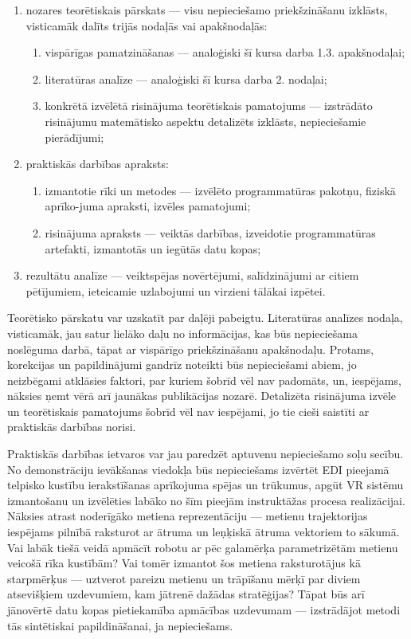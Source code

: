 \documentclass[12pt, a4paper]{article}
\numberwithin{equation}{section} %
\begin{document}
\begin{enumerate}
    \item nozares teorētiskais pārskats --- visu nepieciešamo priekšzināšanu izklāsts, visticamāk dalīts trijās nodaļās vai apakšnodaļās:
    \begin{enumerate}
        \item vispārīgas pamatzināšanas --- analoģiski šī kursa darba 1.3. apakšnodaļai;
        \item literatūras analīze --- analoģiski šī kursa darba 2. nodaļai;
        \item konkrētā izvēlētā risinājuma teorētiskais pamatojums --- izstrādāto risinājumu matemātisko aspektu detalizēts izklāsts, nepieciešamie pierādījumi;
    \end{enumerate}
    \item praktiskās darbības apraksts:
    \begin{enumerate}
        \item izmantotie rīki un metodes --- izvēlēto programmatūras pakotņu, fiziskā aprīko-juma apraksti, izvēles pamatojumi;
        \item risinājuma apraksts --- veiktās darbības, izveidotie programmatūras artefakti, izmantotās un iegūtās datu kopas;
    \end{enumerate}
    \item rezultātu analīze --- veiktspējas novērtējumi, salīdzinājumi ar citiem pētījumiem, ieteicamie uzlabojumi un virzieni tālākai izpētei.
\end{enumerate}

Teorētisko pārskatu var uzskatīt par daļēji pabeigtu. Literatūras analīzes nodaļa, visticamāk, jau satur lielāko daļu no informācijas, kas būs nepieciešama noslēguma darbā, tāpat ar vispārīgo priekšzināšanu apakšnodaļu. Protams, korekcijas un papildinājumi gandrīz noteikti būs nepieciešami abiem, jo neizbēgami atklāsies faktori, par kuriem šobrīd vēl nav padomāts, un, iespējams, nāksies ņemt vērā arī jaunākas publikācijas nozarē. Detalizēta risinājuma izvēle un teorētiskais pamatojums šobrīd vēl nav iespējami, jo tie cieši saistīti ar praktiskās darbības norisi.

Praktiskās darbības ietvaros var jau paredzēt aptuvenu nepieciešamo soļu secību. No demonstrāciju ievākšanas viedokļa būs nepieciešams izvērtēt EDI pieejamā telpisko kustību ierakstīšanas aprīkojuma spējas un trūkumus, apgūt VR sistēmu izmantošanu un izvēlēties labāko no šīm pieejām instruktāžas procesa realizācijai. Nāksies atrast noderīgāko metiena reprezentāciju --- metienu trajektorijas iespējams pilnībā raksturot ar ātruma un leņķiskā ātruma vektoriem to sākumā. Vai labāk tiešā veidā apmācīt robotu ar pēc galamērķa parametrizētām metienu veicošā rīka kustībām? Vai tomēr izmantot šos metiena raksturotājus kā starpmērķus --- uztverot pareizu metienu un trāpīšanu mērķī par diviem atsevišķiem uzdevumiem, kam jātrenē dažādas stratēģijas? Tāpat būs arī jānovērtē datu kopas pietiekamība apmācības uzdevumam --- izstrādājot metodi tās sintētiskai papildināšanai, ja nepieciešams.
\end{document}
